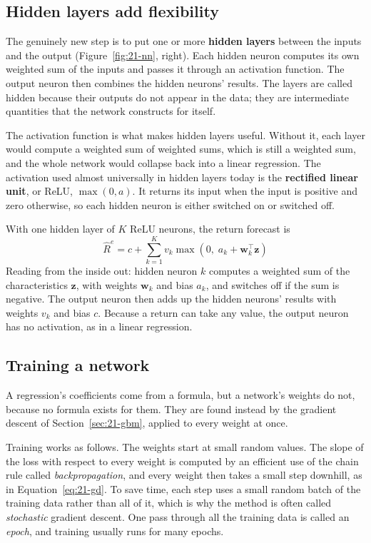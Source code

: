 \subsection{Hidden layers add flexibility}

The genuinely new step is to put one or more \textbf{hidden layers} between the inputs and the output (Figure~\ref{fig:21-nn}, right). Each hidden neuron computes its own weighted sum of the inputs and passes it through an activation function. The output neuron then combines the hidden neurons' results. The layers are called hidden because their outputs do not appear in the data; they are intermediate quantities that the network constructs for itself.

The activation function is what makes hidden layers useful. Without it, each layer would compute a weighted sum of weighted sums, which is still a weighted sum, and the whole network would collapse back into a linear regression. The activation used almost universally in hidden layers today is the \textbf{rectified linear unit}, or ReLU, $\max(0, a)$. It returns its input when the input is positive and zero otherwise, so each hidden neuron is either switched on or switched off.

With one hidden layer of $K$ ReLU neurons, the return forecast is
\begin{equation}
  \hat{R}^{e} = c + \sum_{k=1}^{K} v_k \max\!\left(0,\; a_k + \mathbf{w}_k^{\top}\mathbf{z}\right)
  \label{eq:21-nn}
\end{equation}
Reading from the inside out: hidden neuron $k$ computes a weighted sum of the characteristics $\mathbf{z}$, with weights $\mathbf{w}_k$ and bias $a_k$, and switches off if the sum is negative. The output neuron then adds up the hidden neurons' results with weights $v_k$ and bias $c$. Because a return can take any value, the output neuron has no activation, as in a linear regression.


\subsection{Training a network}

A regression's coefficients come from a formula, but a network's weights do not, because no formula exists for them. They are found instead by the gradient descent of Section~\ref{sec:21-gbm}, applied to every weight at once.

Training works as follows. The weights start at small random values. The slope of the loss with respect to every weight is computed by an efficient use of the chain rule called \emph{backpropagation}, and every weight then takes a small step downhill, as in Equation~\eqref{eq:21-gd}. To save time, each step uses a small random batch of the training data rather than all of it, which is why the method is often called \emph{stochastic} gradient descent. One pass through all the training data is called an \emph{epoch}, and training usually runs for many epochs.



